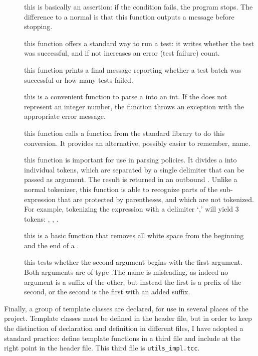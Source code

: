\documentclass{article}
\begin{document}
\begin{description}
\item[] this is basically an assertion: if the condition fails, the program stops. The difference to a normal  is that this function outputs a message before stopping.
\item[] this function offers a standard way to run a test: it writes whether the test was successful, and if not increases an error (test failure) count.
\item[] this function prints a final message reporting whether a test batch was successful or how many tests failed.
\item[] this is a convenient function to parse a  into an int. If the  does not represent an integer number, the function throws an exception with the appropriate error message.
\item[] this function calls a function from the standard library to do this conversion. It provides an alternative, possibly easier to remember, name.
\item[] this function is important for use in parsing policies. It divides a  into individual tokens, which are separated by a single delimiter that can be passed as argument. The result is returned in an outbound . Unlike a normal tokenizer, this function is able to recognize parts of the sub-expression that are protected by parentheses, and which are not tokenized. For example, tokenizing the expression  with a delimiter `,' will yield 3 tokens: , , .
\item[] this is a basic function that removes all white space from the beginning and the end of a .
\item[] this tests whether the second argument begins with the first argument. Both arguments are of type \cstring.The name is misleading, as indeed no argument is a suffix of the other, but instead the first is a prefix of the second, or the second is the first with an added suffix.
\end{description}

Finally, a group of template classes are declared, for use in several places of the project. Template classes must be defined in the header file, but in order to keep the distinction of declaration and definition in different files, I have adopted a standard practice: define template functions in a third file and include at the right point in the header file. This third file is \verb|utils_impl.tcc|.
\end{document}
